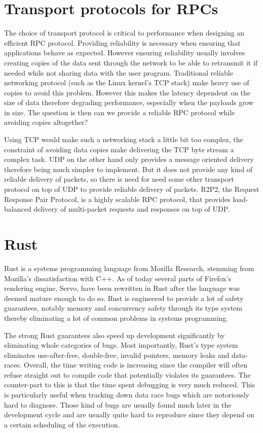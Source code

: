 \section{Transport protocols for RPCs}

The choice of transport protocol is critical to performance when
designing an efficient RPC protocol. Providing reliability is
necessary when ensuring that applications behave as expected. However
ensuring reliability usually involves creating copies of the data sent
through the network to be able to retransmit it if needed while not
sharing data with the user program. Traditional reliable networking
protocol (such as the Linux kernel's TCP stack) make heavy use of
copies to avoid this problem. However this makes the latency dependent
on the size of data therefore degrading performance, especially when
the payloads grow in size. The question is then can we provide a
reliable RPC protocol while avoiding copies altogether?

Using TCP would make such a networking stack a little bit too complex,
the constraint of avoiding data copies make delivering the TCP byte
stream a complex task. UDP on the other hand only provides a message
oriented delivery therefore being much simpler to implement. But it
does not provide any kind of reliable delivery of packets, so there is
need for need some other transport protocol on top of UDP to provide
reliable delivery of packets. R2P2, the Request Response Pair
Protocol, is a highly scalable RPC protocol, that provides
load-balanced delivery of multi-packet requests and responses on top
of UDP.

\section{Rust}

Rust is a systems programming language from Mozilla Research, stemming
from Mozilla's dissatisfaction with C++. As of today several parts of
Firefox's rendering engine, Servo, have been rewritten in Rust after
the language was deemed mature enough to do so. Rust is engineered to
provide a lot of safety guarantees, notably memory and concurrency
safety through its type system thereby eliminating a lot of common
problems in systems programming.

The strong Rust guarantees also speed up development significantly by
eliminating whole categories of bugs. Most importantly, Rust's type system
eliminates use-after-free, double-free, invalid pointers, memory leaks
and data-races. Overall, the time writing code is increasing since the
compiler will often refuse straight out to compile code that
potentially violates its guarantees. The counter-part to this is that
the time spent debugging is very much reduced. This is particularly
useful when tracking down data race bugs which are notoriously hard to
diagnose. Those kind of bugs are usually found much later in the
development cycle and are usually quite hard to reproduce since they
depend on a certain scheduling of the execution.

